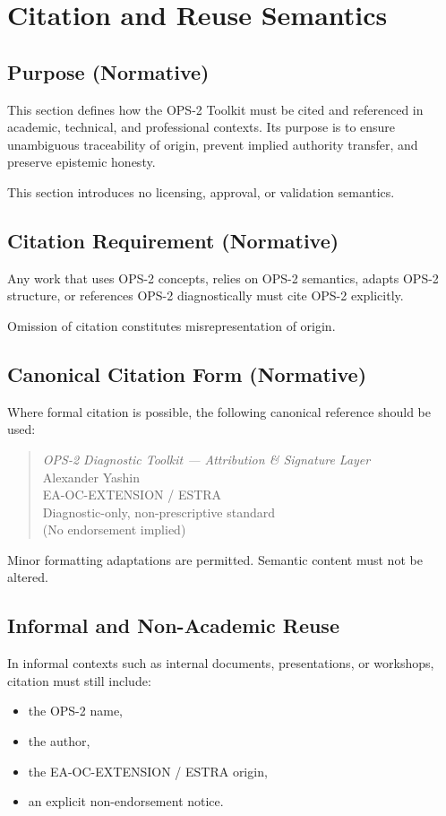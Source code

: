 \section{Citation and Reuse Semantics}

\subsection{Purpose (Normative)}
This section defines how the OPS-2 Toolkit must be cited and referenced in academic, technical, and professional contexts.
Its purpose is to ensure unambiguous traceability of origin, prevent implied authority transfer, and preserve epistemic honesty.

This section introduces no licensing, approval, or validation semantics.

\subsection{Citation Requirement (Normative)}
Any work that uses OPS-2 concepts, relies on OPS-2 semantics, adapts OPS-2 structure, or references OPS-2 diagnostically must cite OPS-2 explicitly.

Omission of citation constitutes misrepresentation of origin.

\subsection{Canonical Citation Form (Normative)}
Where formal citation is possible, the following canonical reference should be used:
\begin{quote}
\emph{OPS-2 Diagnostic Toolkit — Attribution \& Signature Layer}\\
Alexander Yashin\\
EA-OC-EXTENSION / ESTRA\\
Diagnostic-only, non-prescriptive standard\\
(No endorsement implied)
\end{quote}

Minor formatting adaptations are permitted.
Semantic content must not be altered.

\subsection{Informal and Non-Academic Reuse}
In informal contexts such as internal documents, presentations, or workshops, citation must still include:
\begin{itemize}
  \item the OPS-2 name,
  \item the author,
  \item the EA-OC-EXTENSION / ESTRA origin,
  \item an explicit non-endorsement notice.
\end{itemize}


